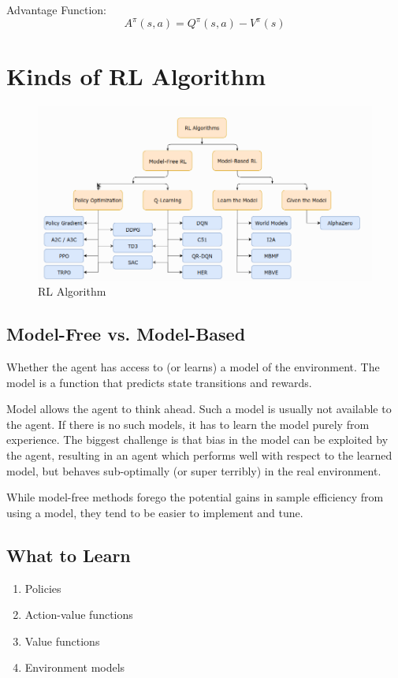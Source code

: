 \documentclass{article}
\begin{document}
    Advantage Function:
      $$
        A^\pi(s, a) = Q^\pi(s, a) - V^\pi(s)
      $$

\section{Kinds of RL Algorithm}
  \begin{figure}[H]
    \includegraphics[width=\linewidth]{rlalg.png}
    \caption{RL Algorithm}
    \label{fig:ag}
  \end{figure}
  \subsection{Model-Free vs. Model-Based}
    Whether the agent has access to (or learns) a model of the environment. The model is a function that predicts state transitions and rewards.

    Model allows the agent to think ahead. Such a model is usually not available to the agent. If there is no such models, it has to learn the model purely from experience.  The biggest challenge is that bias in the model can be exploited by the agent, resulting in an agent which performs well with respect to the learned model, but behaves sub-optimally (or super terribly) in the real environment.

    While model-free methods forego the potential gains in sample efficiency from using a model, they tend to be easier to implement and tune. 
  \subsection{What to Learn}
    \begin{enumerate}
      \item Policies
      \item Action-value functions
      \item Value functions
      \item Environment models
    \end{enumerate}
\end{document}
